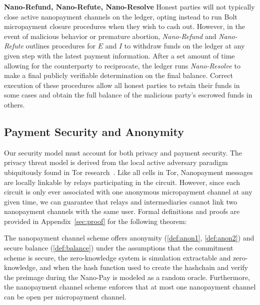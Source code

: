 \textbf{Nano-Refund, Nano-Refute, Nano-Resolve} Honest parties will not
typically close active nanopayment channels on the ledger, opting instead to run
Bolt micropayment closure procedures when they wish to cash out. However, in the
event of malicious behavior or premature abortion, \emph{Nano-Refund} and
\emph{Nano-Refute} outlines procedures for $E$ and $I$ to withdraw funds on the
ledger at any given step with the latest payment information. After a set amount
of time allowing for the counterparty to reciprocate, the ledger runs
\emph{Nano-Resolve} to make a final publicly verifiable determination on the
final balance. Correct execution of these procedures allow all honest parties to
retain their funds in some cases and obtain the full balance of the malicious
party's escrowed funds in others.

\subsection{Payment Security and Anonymity}
\label{subsec:paysecurity}
Our security model must account for both privacy and payment security. The
privacy threat model is derived from the local active adversary paradigm
ubiquitously found in Tor research~\cite{dingledine2004tor}. Like all cells in
Tor, Nanopayment messages are locally linkable by relays participating in the
circuit. However, since each circuit is only ever associated with one anonymous
micropayment channel at any given time, we can guarantee that relays and
intermediaries cannot link two nanopayment channels with the same user. Formal
definitions and proofs are provided in Appendix~\ref{sec:proof} for the
following theorem:

\begin{theorem}
  The nanopayment channel scheme offers anonymity (\ref{def:anon1},
  \ref{def:anon2}) and secure balance (\ref{def:balance}) under the assumptions
  that the commitment scheme is secure, the zero-knowledge system is simulation
  extractable and zero-knowledge, and when the hash function used to create the
  hashchain and verify the preimage during the Nano-Pay is modeled as a random
  oracle.
%
    Furthermore, the nanopayment channel scheme enforces that at most one
    nanopayment channel can be open per micropayment channel.


\end{theorem}

